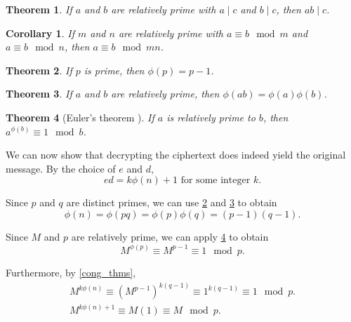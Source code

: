 \documentclass[10pt]{article}
\newtheorem{theorem}{Theorem}[section]
\newtheorem{corollary}{Corollary}[theorem]
\begin{document}
\begin{theorem}
    If $a$ and $b$ are relatively prime with $a \mid c$ and $b  \mid c$, then $a b \mid c$.
\end{theorem}

\begin{corollary}
\label{cong_rel-prime}
    If $m$ and $n$ are relatively prime with $a \equiv b \mod m$ and $a \equiv b \mod n$, then $a \equiv b \mod m n$.
\end{corollary}

\begin{theorem}
\label{phi_prime}
    If $p$ is prime, then $\phi(p) = p - 1$.
\end{theorem}

\begin{theorem}
\label{phi_mult}
    If $a$ and $b$ are relatively prime, then $\phi(a b) = \phi(a) \phi(b)$.
\end{theorem}

\begin{theorem}[Euler's theorem \cite{burton2006elementary}]
\label{euler}
    If $a$ is relatively prime to $b$, then $a^{\phi(b)} \equiv 1 \mod b$.
\end{theorem}

We can now show that decrypting the ciphertext does indeed yield the original message. By the choice of $e$ and $d$,
\begin{equation}
\label{ed_id}
    e d = k \phi(n) + 1 \text{ for some integer }k.
\end{equation}

\noindent Since $p$ and $q$ are distinct primes, we can use \ref{phi_prime} and \ref{phi_mult} to obtain
\begin{equation}
    \phi(n) = \phi(p q) = \phi(p) \phi(q) = (p - 1) (q - 1).
\end{equation}

\noindent Since $M$ and $p$ are relatively prime, we can apply \ref{euler} to obtain
\begin{equation}
    M^{\phi(p)} \equiv M^{p - 1} \equiv 1 \mod p.
\end{equation}

\noindent Furthermore, by \ref{cong_thms},
\begin{align}
    M^{k \phi(n)} \equiv (M^{p - 1})^{k (q - 1)} \equiv 1^{k (q - 1)} \equiv 1 \mod p.
 \\ \label{Mmodp}
    M^{k \phi(n) + 1} \equiv M (1) \equiv M \mod p.
\end{align}
\end{document}
